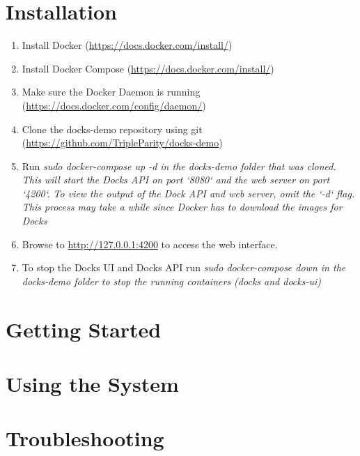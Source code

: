 \documentclass[]{article}
\begin{document}
\section{Installation}
\begin{enumerate}
	\item Install Docker (\url{https://docs.docker.com/install/})
	\item Install Docker Compose (\url{https://docs.docker.com/install/})
	\item Make sure the Docker Daemon is running (\url{https://docs.docker.com/config/daemon/})
	\item Clone the docks-demo repository using git (\url{https://github.com/TripleParity/docks-demo})
	\item Run \em{sudo docker-compose up -d} in the \em{docks-demo} folder that was cloned. This will start the Docks API on port `8080` and the web server on port `4200`. To view the output of the Dock API and web server, omit the `-d` flag. This process may take a while since Docker has to download the images for Docks
	\item Browse to \url{http://127.0.0.1:4200} to access the web interface.
	\item To stop the Docks UI and Docks API run \em{sudo docker-compose down} in the \em{docks-demo} folder to stop the running containers (docks and docks-ui)
\end{enumerate}


\section{Getting Started}

\section{Using the System}

\section{Troubleshooting}
\end{document}
